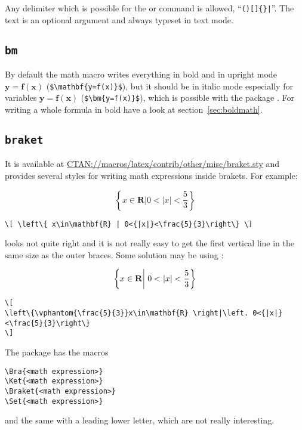 \begin{table}[htb]
Any delimiter which is possible for the  or  command
is allowed, \eg ``\verb/()[]{}|/''. The text is an optional argument and 
always typeset in text mode.

\subsection{\texttt{bm}}\label{sec:bm}
By default the math macro  writes everything in bold and in upright mode
$\mathbf{y=f(x)}$  (\verb|$\mathbf{y=f(x)}$|), but it should be in italic mode especially
for variables $\bm{y=f(x)}$ (\verb|$\bm{y=f(x)}$|), which is possible with the package . 
For writing a whole formula in bold have a look at section~\vref{sec:boldmath}.


\subsection{\texttt{braket}}\label{sec:braket}
It is available at
 \href{http://www.ctan.org/tex-archive/macros/latex/contrib/other/misc/braket.sty}%
{CTAN://macros/latex/contrib/other/misc/braket.sty}
and provides several styles for writing math expressions inside brakets. For example:

\[ \left\{ x\in\mathbf{R} | 0<{|x|}<\frac{5}{3}\right\} \]

\begin{lstlisting}
\[ \left\{ x\in\mathbf{R} | 0<{|x|}<\frac{5}{3}\right\} \]
\end{lstlisting}

\noindent looks not quite right and it is not really easy to get the first vertical line in the same
size as the outer braces. Some solution may be using :

\[
\left\{\vphantom{\frac{5}{3}}x\in\mathbf{R} \right|\left. 0<{|x|}<\frac{5}{3}\right\}
\]

\begin{lstlisting}
\[
\left\{\vphantom{\frac{5}{3}}x\in\mathbf{R} \right|\left. 0<{|x|}<\frac{5}{3}\right\}
\]
\end{lstlisting}

The package  has the macros

\begin{lstlisting}
\Bra{<math expression>}
\Ket{<math expression>}
\Braket{<math expression>}
\Set{<math expression>}
\end{lstlisting}

\noindent and the same with a leading lower letter, which are not really interesting.


\end{table}
